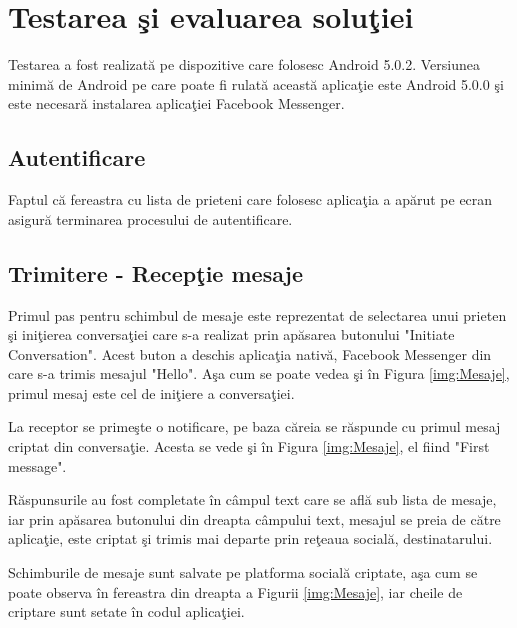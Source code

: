 \chapter{Testarea \c{s}i evaluarea solu\c{t}iei}

Testarea a fost realizat\u{a} pe dispozitive care folosesc Android 5.0.2. Versiunea minim\u{a} de Android pe care poate fi rulat\u{a} aceast\u{a} aplica\c{t}ie este Android 5.0.0 \c{s}i este necesar\u{a} instalarea aplica\c{t}iei Facebook Messenger.

\section{Autentificare}

Faptul c\u{a} fereastra cu lista de prieteni care folosesc aplica\c{t}ia a ap\u{a}rut pe ecran asigur\u{a} terminarea procesului de autentificare.

\section{Trimitere - Recep\c{t}ie mesaje}

Primul pas pentru schimbul de mesaje este reprezentat de selectarea unui prieten \c{s}i ini\c{t}ierea conversa\c{t}iei care s-a realizat prin ap\u{a}sarea butonului "Initiate Conversation". Acest buton a deschis aplica\c{t}ia nativ\u{a}, Facebook Messenger din care s-a trimis mesajul "Hello". A\c{s}a cum se poate vedea \c{s}i \^{i}n Figura \ref{img:Mesaje}, primul mesaj este cel de ini\c{t}iere a conversa\c{t}iei.

La receptor se prime\c{s}te o notificare, pe baza c\u{a}reia se r\u{a}spunde cu primul mesaj criptat din conversa\c{t}ie. Acesta se vede \c{s}i \^{i}n Figura \ref{img:Mesaje}, el fiind "First message".

R\u{a}spunsurile au fost completate \^{i}n c\^{a}mpul text care se afl\u{a} sub lista de mesaje, iar prin ap\u{a}sarea butonului din dreapta c\^{a}mpului text, mesajul se preia de c\u{a}tre aplica\c{t}ie, este criptat \c{s}i trimis mai departe prin re\c{t}eaua social\u{a}, destinatarului.

Schimburile de mesaje sunt salvate pe platforma social\u{a} criptate, a\c{s}a cum se poate observa \^{i}n fereastra din dreapta a Figurii \ref{img:Mesaje}, iar cheile de criptare sunt setate \^{i}n codul aplica\c{t}iei.


